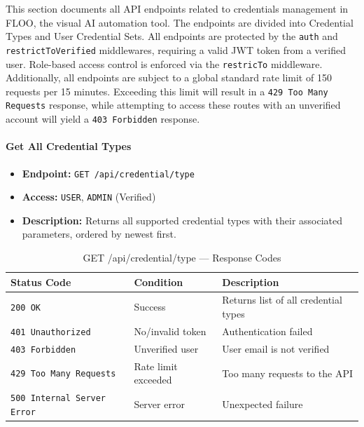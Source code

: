 This section documents all API endpoints related to credentials management in FLOO, the visual AI automation tool.
The endpoints are divided into Credential Types and User Credential Sets.
All endpoints are protected by the \texttt{auth} and \texttt{restrictToVerified} middlewares, requiring a valid JWT token from a verified user.
Role-based access control is enforced via the \texttt{restricTo} middleware.
Additionally, all endpoints are subject to a global standard rate limit of 150 requests per 15 minutes.
Exceeding this limit will result in a \texttt{429 Too Many Requests} response, while attempting to access these routes with an unverified account will yield a \texttt{403 Forbidden} response.

\paragraph{Get All Credential Types}
\label{subsubsec:get-all-credential-types}

\begin{itemize}
  \item \textbf{Endpoint:} \texttt{GET /api/credential/type}
  \item \textbf{Access:} \texttt{USER}, \texttt{ADMIN} (Verified)
  \item \textbf{Description:} Returns all supported credential types with their associated parameters, ordered by newest first.
\end{itemize}

\begin{table}[H]
\centering
\renewcommand{\arraystretch}{1.3}
\begin{tabularx}{\textwidth}{|l|l|X|}
\hline
\textbf{Status Code} & \textbf{Condition} & \textbf{Description} \\
\hline
\texttt{200 OK}           & Success      & Returns list of all credential types \\
\hline
\texttt{401 Unauthorized} & No/invalid token & Authentication failed \\
\hline
\texttt{403 Forbidden}    & Unverified user & User email is not verified \\
\hline
\texttt{429 Too Many Requests} & Rate limit exceeded & Too many requests to the API \\
\hline
\texttt{500 Internal Server Error} & Server error & Unexpected failure \\
\hline
\end{tabularx}
\caption{GET /api/credential/type — Response Codes}
\label{tab:get-all-credential-types-responses}
\end{table}
\FloatBarrier

